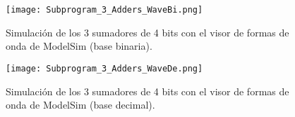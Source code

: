 \begin{figure}[ht]
	\centering
	\texttt{[image: Subprogram\_3\_Adders\_WaveBi.png]}
	\caption{Simulación de los 3 sumadores de 4 bits con el visor de formas de onda de ModelSim (base binaria). \label{fig:subprogram_3_adders_wavebi}}
\end{figure}

\begin{figure}[ht]
	\centering
	\texttt{[image: Subprogram\_3\_Adders\_WaveDe.png]}
	\caption{Simulación de los 3 sumadores de 4 bits con el visor de formas de onda de ModelSim (base decimal). \label{fig:subprogram_3_adders_wavede}}
\end{figure}